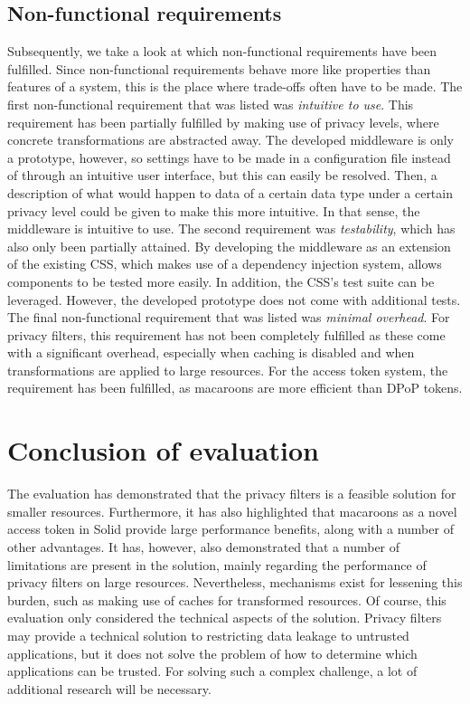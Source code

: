 \subsection{Non-functional requirements}
Subsequently, we take a look at which non-functional requirements have been fulfilled. Since non-functional requirements behave more like properties than features of a system, this is the place where trade-offs often have to be made. The first non-functional requirement that was listed was \textit{intuitive to use}. This requirement has been partially fulfilled by making use of privacy levels, where concrete transformations are abstracted away. The developed middleware is only a prototype, however, so settings have to be made in a configuration file instead of through an intuitive user interface, but this can easily be resolved. Then, a description of what would happen to data of a certain data type under a certain privacy level could be given to make this more intuitive. In that sense, the middleware is intuitive to use. The second requirement was \textit{testability}, which has also only been partially attained. By developing the middleware as an extension of the existing \gls{CSS}, which makes use of a dependency injection system, allows components to be tested more easily. In addition, the \gls{CSS}'s test suite can be leveraged. However, the developed prototype does not come with additional tests. The final non-functional requirement that was listed was \textit{minimal overhead}. For privacy filters, this requirement has not been completely fulfilled as these come with a significant overhead, especially when caching is disabled and when transformations are applied to large resources. For the access token system, the requirement has been fulfilled, as macaroons are more efficient than \gls{DPoP} tokens.

\section{Conclusion of evaluation}
The evaluation has demonstrated that the privacy filters is a feasible solution for smaller resources. Furthermore, it has also highlighted that macaroons as a novel access token in Solid provide large performance benefits, along with a number of other advantages. It has, however, also demonstrated that a number of limitations are present in the solution, mainly regarding the performance of privacy filters on large resources. Nevertheless, mechanisms exist for lessening this burden, such as making use of caches for transformed resources. Of course, this evaluation only considered the technical aspects of the solution. Privacy filters may provide a technical solution to restricting data leakage to untrusted applications, but it does not solve the problem of how to determine which applications can be trusted. For solving such a complex challenge, a lot of additional research will be necessary. 
